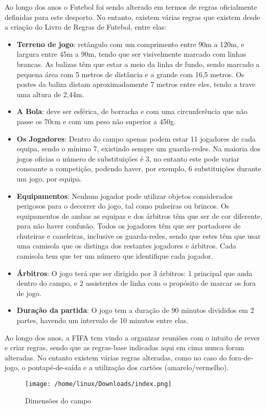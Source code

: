 \documentclass[a4paper,12pt]{report}
\begin{document}
Ao longo dos anos o Futebol foi sendo alterado em termos de regras oficialmente definidas para este desporto. No entanto, existem várias regras que existem desde a criação do Livro de Regras de Futebol, entre elas:
\begin{itemize}
\item {\bf Terreno de jogo}: retângulo com um comprimento entre 90m a 120m, e largura entre 45m a 90m, tendo que ser visivelmente marcado com linhas brancas. As balizas têm que estar a meio da linha de fundo, sendo marcado a pequena área com 5 metros de distância e a grande com 16,5 metros. Os postes da baliza distam aproximadamente 7 metros entre eles, tendo a trave uma altura de 2,44m.

\item {\bf A Bola}: deve ser esférica, de borracha e com uma circunferência que não passe os 70cm e com um peso não superior a 450g.

\item {\bf Os Jogadores}: Dentro do campo apenas podem estar 11 jogadores de cada equipa, sendo o mínimo 7, existindo sempre um guarda-redes. Na maioria dos jogos oficias o número de substituições é 3, no entanto este pode variar consoante a competição, podendo haver, por exemplo, 6 substituições durante um jogo, por equipa.

\item {\bf Equipamentos}: Nenhum jogador pode utilizar objetos considerados perigosos para o decorrer do jogo, tal como pulseiras ou brincos. Os equipamentos de ambas as equipas e dos árbitros têm que ser de cor diferente, para não haver confusão. Todos os jogadores têm que ser portadores de chuteiras e caneleiras, inclusive os guarda-redes, sendo que estes têm que usar uma camisola que os distinga dos restantes jogadores e árbitros. Cada camisola tem que ter um número que identifique cada jogador.

\item {\bf Árbitros}: O jogo terá que ser dirigido por 3 árbitros: 1 principal que anda dentro do campo, e 2 assistentes de linha com o propósito de marcar os fora de jogo.

\item {\bf Duração da partida}: O jogo tem a duração de 90 minutos divididos em 2 partes, havendo um intervalo de 10 minutos entre elas.
\end{itemize}

Ao longo dos anos, a FIFA tem vindo a organizar reuniões com o intuito de rever e criar regras, sendo que as regras-base indicadas aqui em cima nunca foram alteradas. No entanto existem várias regras alteradas, como no caso do fora-de-jogo, o pontapé-de-saída e a utilização dos cartões (amarelo/vermelho).
\begin{figure}[!htp]
\centering 
\texttt{[image: /home/linux/Downloads/index.png]}
\caption{Dimensões do campo}
\end{figure} 
\end{document}
